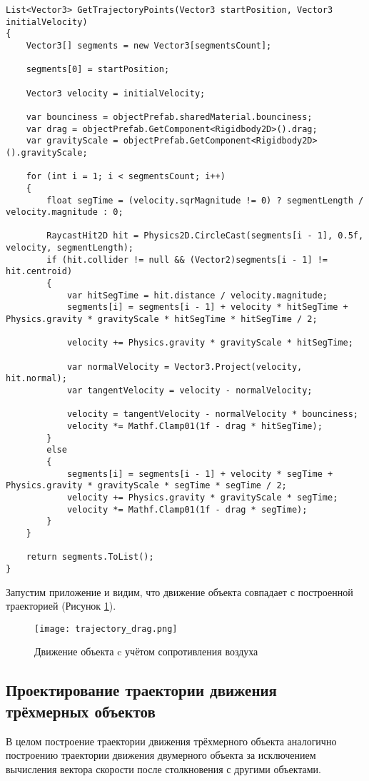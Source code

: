 \begin{lstlisting}[style=fsharpstyle, caption={Построение траектории движущегося объекта c учётом сопротивления воздуха}, label=listing.trajectory_drag]
List<Vector3> GetTrajectoryPoints(Vector3 startPosition, Vector3 initialVelocity)
{
	Vector3[] segments = new Vector3[segmentsCount];
	
	segments[0] = startPosition;
	
	Vector3 velocity = initialVelocity;
	
	var bounciness = objectPrefab.sharedMaterial.bounciness;
	var drag = objectPrefab.GetComponent<Rigidbody2D>().drag;
	var gravityScale = objectPrefab.GetComponent<Rigidbody2D>().gravityScale;
	
	for (int i = 1; i < segmentsCount; i++)
	{
		float segTime = (velocity.sqrMagnitude != 0) ? segmentLength / velocity.magnitude : 0;
		
		RaycastHit2D hit = Physics2D.CircleCast(segments[i - 1], 0.5f, velocity, segmentLength);
		if (hit.collider != null && (Vector2)segments[i - 1] != hit.centroid)
		{
			var hitSegTime = hit.distance / velocity.magnitude;
			segments[i] = segments[i - 1] + velocity * hitSegTime + Physics.gravity * gravityScale * hitSegTime * hitSegTime / 2;
			
			velocity += Physics.gravity * gravityScale * hitSegTime;
			
			var normalVelocity = Vector3.Project(velocity, hit.normal);
			var tangentVelocity = velocity - normalVelocity;
			
			velocity = tangentVelocity - normalVelocity * bounciness;
			velocity *= Mathf.Clamp01(1f - drag * hitSegTime);
		}
		else
		{
			segments[i] = segments[i - 1] + velocity * segTime + Physics.gravity * gravityScale * segTime * segTime / 2;
			velocity += Physics.gravity * gravityScale * segTime;
			velocity *= Mathf.Clamp01(1f - drag * segTime);
		}
	}
	
	return segments.ToList();
}
\end{lstlisting}

Запустим приложение и видим, что движение объекта совпадает с построенной траекторией (Рисунок \ref{picture.trajectory_drag}).

\begin{figure}[h]
	\noindent\centering
	\texttt{[image: trajectory\_drag.png]}  
	\caption{Движение объекта c учётом сопротивления воздуха}
	\label{picture.trajectory_drag}
\end{figure}

\subsection{Проектирование траектории движения трёхмерных объектов}
В целом построение траектории движения трёхмерного объекта аналогично построению траектории движения двумерного объекта за исключением вычисления вектора скорости после столкновения с другими объектами.

